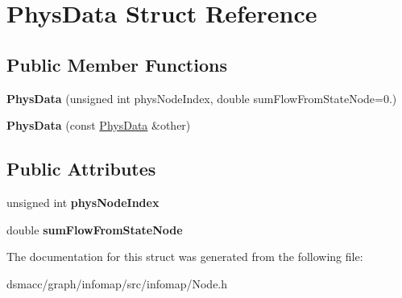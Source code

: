 \hypertarget{structPhysData}{}\section{Phys\+Data Struct Reference}
\label{structPhysData}
\subsection*{Public Member Functions}
\begin{DoxyCompactItemize}
\item 
\mbox{\label{structPhysData_a14e4f89a5da31aa93104464133354069}} 
{\bfseries Phys\+Data} (unsigned int phys\+Node\+Index, double sum\+Flow\+From\+State\+Node=0.)
\item 
\mbox{\label{structPhysData_ad2f42509cb3daaec54875f0ce61a245e}} 
{\bfseries Phys\+Data} (const \mbox{\hyperlink{structPhysData}{Phys\+Data}} \&other)
\end{DoxyCompactItemize}
\subsection*{Public Attributes}
\begin{DoxyCompactItemize}
\item 
\mbox{\label{structPhysData_a5453bd66c78c7b4902741f096aa5faa5}} 
unsigned int {\bfseries phys\+Node\+Index}
\item 
\mbox{\label{structPhysData_ab2437bc993ce3e847351258f21506f2e}} 
double {\bfseries sum\+Flow\+From\+State\+Node}
\end{DoxyCompactItemize}


The documentation for this struct was generated from the following file\+:\begin{DoxyCompactItemize}
\item 
dsmacc/graph/infomap/src/infomap/Node.\+h\end{DoxyCompactItemize}
